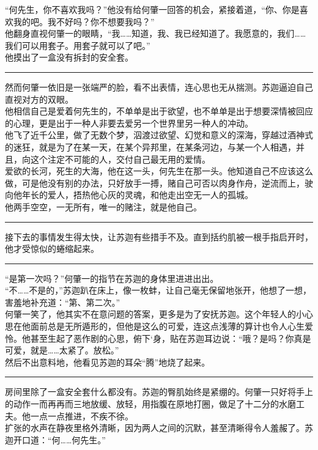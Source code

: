 \documentclass[oneside,11pt]{memoir} %
\begin{document}
\begin{CJK}{UTF8}{gbsn}
     “何先生，你不喜欢我吗？”他没有给何肇一回答的机会，紧接着道，“你、你是喜欢我的吧。我不好吗？你不想要我吗？”\\\indent
     他翻身直视何肇一的眼睛，“我……知道，我、我已经知道了。我愿意的，我们……我们可以用套子。用套子就可以了吧。”\\\indent
     他摸出了一盒没有拆封的安全套。\\\indent
\rule{-3pt}{30pt}         
     然而何肇一依旧是一张端严的脸，看不出表情，连心思也无从揣测。苏迦逼迫自己直视对方的双眼。\\\indent
    他相信自己是爱着何先生的，不单单是出于欲望，也不单单是出于想要深情被回应的心理，更是出于一种人非要去爱另一个世界里另一种人的冲动。\\\indent
    他飞了近千公里，做了无数个梦，泅渡过欲望、幻觉和意义的深海，穿越过酒神式的迷狂，就是为了在某一天，在某个异邦里，在某条河边，与某一个人相遇，并且，向这个注定不可能的人，交付自己最无用的爱情。\\\indent
     爱欲的长河，死生的大海，他在这一头，何先生在那一头。他知道自己不应该这么做，可是他没有别的办法，只好放手一搏，赌自己可否以肉身作舟，逆流而上，驶向他年长的爱人，捂热他心灰的灵魂，和他走出空无一人的孤城。\\\indent
     他两手空空，一无所有，唯一的赌注，就是他自己。\\\indent
\rule{-3pt}{30pt}
     接下去的事情发生得太快，让苏迦有些措手不及。直到括约肌被一根手指启开时，他才受惊似的蜷缩起来。\\\indent
\rule{-3pt}{30pt}
     “是第一次吗？”何肇一的指节在苏迦的身体里进进出出。\\\indent
     “不……不是的，”苏迦趴在床上，像一枚蚌，让自己毫无保留地张开，他想了一想，害羞地补充道：“第、第二次。”\\\indent
     何肇一笑了，他其实不在意问题的答案，更多是为了安抚苏迦。这个年轻人的小心思在他面前总是无所遁形的，但他是这么的可爱，连这点浅薄的算计也令人心生爱怜。他甚至生起了恶作剧的心思，俯下`身，贴在苏迦耳边说：“哦？是吗？你真是可爱，就是……太紧了。放松。”\\\indent
     然后不出意料地，他看见苏迦的耳朵“腾”地烧了起来。\\\indent
    \rule{-3pt}{30pt}
     房间里除了一盒安全套什么都没有。苏迦的臀肌始终是紧绷的。何肇一只好将手上的动作一而再再而三地放缓、放轻，用指腹在原地打圈，做足了十二分的水磨工夫。他一点一点推进，不疾不徐。\\\indent
     扩张的水声在静夜里格外清晰，因为两人之间的沉默，甚至清晰得令人羞赧了。苏迦开口道：“何……何先生。”\\\indent

\end{CJK}
\end{document}
